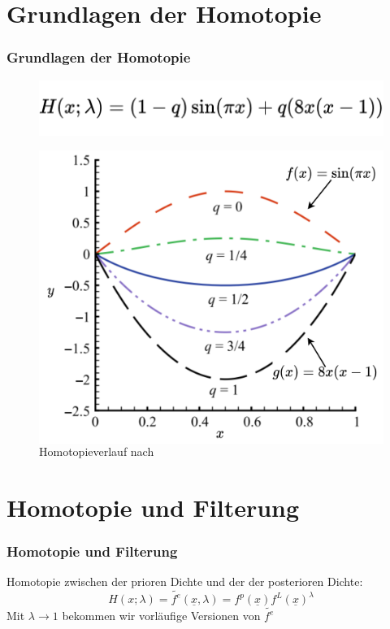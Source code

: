 \documentclass[18pt]{beamer}
\begin{document}
\section{Grundlagen der Homotopie}
\begin{frame}
    \frametitle{Grundlagen der Homotopie}
    \begin{figure}[c]
        \centering
        \includegraphics[scale=0.2]{pictures/homotopieoperator.png}
    \end{figure}
    \begin{figure}
        \begin{columns}
          \includegraphics[width=\textwidth]{pictures/homotopieverlauf.png}
          \caption{Homotopieverlauf nach \cite{liao2012}}
        \end{columns}
      \end{figure}
\end{frame}

\section{Homotopie und Filterung}
\begin{frame}
    \frametitle{Homotopie und Filterung}
    Homotopie  zwischen der prioren Dichte und der der posterioren Dichte:
    \begin{equation}
        H(x; \lambda) = \tilde{f^e}(\underline{x},\lambda) = f^p(\underline{x})f^L(\underline{x})^{\lambda}
     \end{equation}
     \centering
     Mit $\lambda \rightarrow 1$ bekommen wir vorläufige Versionen von $ \tilde{f^e}$
\end{frame}
\end{document}

